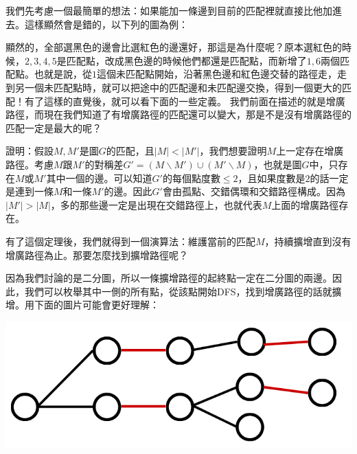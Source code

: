 我們先考慮一個最簡單的想法：如果能加一條邊到目前的匹配裡就直接比他加進去。這樣顯然會是錯的，以下列的圖為例：
\begin{center}
\end{center}
\par 顯然的，全部選黑色的邊會比選紅色的邊還好，那這是為什麼呢？原本選紅色的時候，$2, 3, 4, 5$是匹配點，改成黑色邊的時候他們都還是匹配點，而新增了$1, 6$兩個匹配點。也就是說，從$1$這個未匹配點開始，沿著黑色邊和紅色邊交替的路徑走，走到另一個未匹配點時，就可以把途中的匹配邊和未匹配邊交換，得到一個更大的匹配！有了這樣的直覺後，就可以看下面的一些定義。
我們前面在描述的就是增廣路徑，而現在我們知道了有增廣路徑的匹配還可以變大，那是不是沒有增廣路徑的匹配一定是最大的呢？
\par 證明：假設$M, M'$是圖$G$的匹配，且$|M| < |M'|$，我們想要證明$M$上一定存在增廣路徑。考慮$M$跟$M'$的對稱差$G' = (M \backslash M') \cup (M' \backslash M)$，也就是圖$G$中，只存在$M$或$M'$其中一個的邊。可以知道$G'$的每個點度數$\leq 2$，且如果度數是$2$的話一定是連到一條$M$和一條$M'$的邊。因此$G'$會由孤點、交錯偶環和交錯路徑構成。因為$|M'| > |M|$，多的那些邊一定是出現在交錯路徑上，也就代表$M$上面的增廣路徑存在。
\par 有了這個定理後，我們就得到一個演算法：維護當前的匹配\(M\)，持續擴增直到沒有增廣路徑為止。那要怎麼找到擴增路徑呢？
\par 因為我們討論的是二分圖，所以一條擴增路徑的起終點一定在二分圖的兩邊。因此，我們可以枚舉其中一側的所有點，從該點開始DFS，找到增廣路徑的話就擴增。用下面的圖片可能會更好理解：
\begin{center}
\includegraphics[scale=0.3]{images/Matching/AlternatingTree.png}
\end{center}
